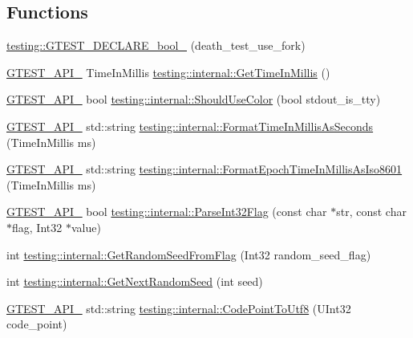 \subsection*{Functions}
\begin{DoxyCompactItemize}
\item 
\hyperlink{namespacetesting_a534f0743e7c42c55d27dcd0dd3d38f18}{testing\-::\-G\-T\-E\-S\-T\-\_\-\-D\-E\-C\-L\-A\-R\-E\-\_\-bool\-\_\-} (death\-\_\-test\-\_\-use\-\_\-fork)
\item 
\hyperlink{gtest-port_8h_aa73be6f0ba4a7456180a94904ce17790}{G\-T\-E\-S\-T\-\_\-\-A\-P\-I\-\_\-} Time\-In\-Millis \hyperlink{namespacetesting_1_1internal_ae66b46943a429e6efb1db456d4cae90c}{testing\-::internal\-::\-Get\-Time\-In\-Millis} ()
\item 
\hyperlink{gtest-port_8h_aa73be6f0ba4a7456180a94904ce17790}{G\-T\-E\-S\-T\-\_\-\-A\-P\-I\-\_\-} bool \hyperlink{namespacetesting_1_1internal_ac1db1b4603967a6c4404f31cbbac31a6}{testing\-::internal\-::\-Should\-Use\-Color} (bool stdout\-\_\-is\-\_\-tty)
\item 
\hyperlink{gtest-port_8h_aa73be6f0ba4a7456180a94904ce17790}{G\-T\-E\-S\-T\-\_\-\-A\-P\-I\-\_\-} std\-::string \hyperlink{namespacetesting_1_1internal_a904485f27a54be8a5a92856e2d838797}{testing\-::internal\-::\-Format\-Time\-In\-Millis\-As\-Seconds} (Time\-In\-Millis ms)
\item 
\hyperlink{gtest-port_8h_aa73be6f0ba4a7456180a94904ce17790}{G\-T\-E\-S\-T\-\_\-\-A\-P\-I\-\_\-} std\-::string \hyperlink{namespacetesting_1_1internal_a5ef227c4a610e7ff638b12dfb25b068e}{testing\-::internal\-::\-Format\-Epoch\-Time\-In\-Millis\-As\-Iso8601} (Time\-In\-Millis ms)
\item 
\hyperlink{gtest-port_8h_aa73be6f0ba4a7456180a94904ce17790}{G\-T\-E\-S\-T\-\_\-\-A\-P\-I\-\_\-} bool \hyperlink{namespacetesting_1_1internal_ae3449e173767750b613114ceac6d916a}{testing\-::internal\-::\-Parse\-Int32\-Flag} (const char $\ast$str, const char $\ast$flag, Int32 $\ast$value)
\item 
int \hyperlink{namespacetesting_1_1internal_ae74fedbdaebaac8d1202192266243b9e}{testing\-::internal\-::\-Get\-Random\-Seed\-From\-Flag} (Int32 random\-\_\-seed\-\_\-flag)
\item 
int \hyperlink{namespacetesting_1_1internal_a6e07a655cb987d131cd8fbeba9a7f1eb}{testing\-::internal\-::\-Get\-Next\-Random\-Seed} (int seed)
\item 
\hyperlink{gtest-port_8h_aa73be6f0ba4a7456180a94904ce17790}{G\-T\-E\-S\-T\-\_\-\-A\-P\-I\-\_\-} std\-::string \hyperlink{namespacetesting_1_1internal_a0c0f9558efb9abb965851c4738cdc725}{testing\-::internal\-::\-Code\-Point\-To\-Utf8} (U\-Int32 code\-\_\-point)

\end{DoxyCompactItemize}
